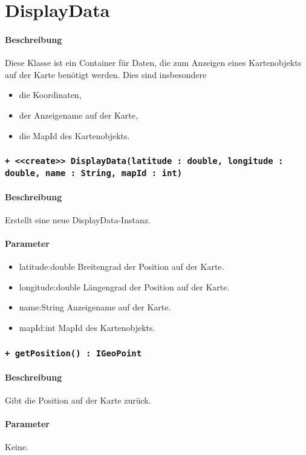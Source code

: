 \section{DisplayData}
\paragraph*{Beschreibung}
Diese Klasse ist ein Container für Daten, die zum Anzeigen eines Kartenobjekts auf der 
Karte benötigt werden. Dies sind insbesondere
\begin{itemize}
    \item die Koordinaten,
    \item der Anzeigename auf der Karte,
    \item die MapId des Kartenobjekts.
\end{itemize}

\subsubsection{\texttt{+ <<create>> DisplayData(latitude : double, longitude : double, name : String, mapId : int)}}%
\paragraph*{Beschreibung}
Erstellt eine neue DisplayData-Instanz.
\paragraph*{Parameter}
\begin{itemize}
    \item latitude:double Breitengrad der Position auf der Karte.
    \item longitude:double Längengrad der Position auf der Karte.
    \item name:String Anzeigename auf der Karte.
    \item mapId:int MapId des Kartenobjekts.
\end{itemize}

\subsubsection{\texttt{+ getPosition() : IGeoPoint}}%
\paragraph*{Beschreibung}
Gibt die Position auf der Karte zurück.
\paragraph*{Parameter}
Keine.
